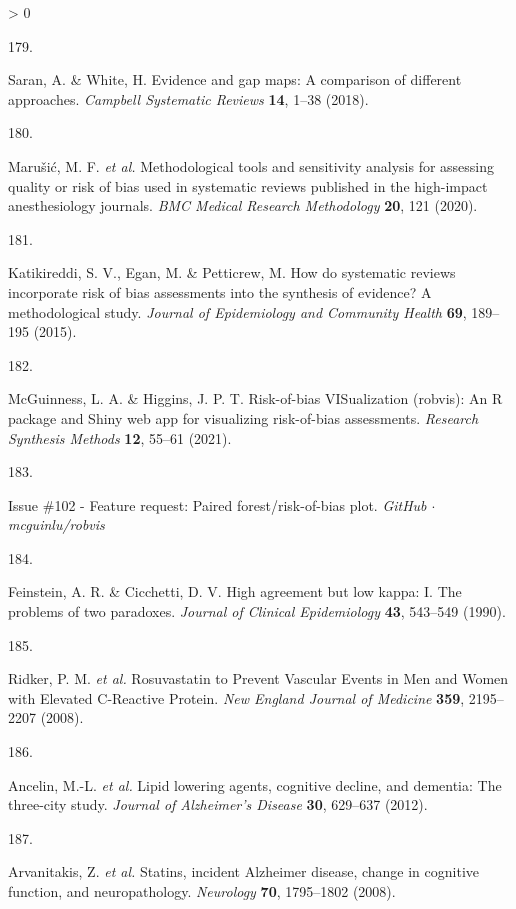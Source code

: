 \documentclass[a4paper, twoside]{templates/ociamthesis}
\newlength{\cslhangindent}
\newlength{\csllabelwidth}
\newenvironment{CSLReferences}[3] %
 {%
  \setlength{\parindent}{0pt}
  \ifodd #1 \everypar{\setlength{\hangindent}{\cslhangindent}}\ignorespaces\fi
  \ifnum #2 > 0
  \setlength{\parskip}{#2\baselineskip}
  \fi
 }%
 {}
\newcommand{\CSLLeftMargin}[1]{\parbox[t]{\maxof{\widthof{#1}}{\csllabelwidth}}{#1}}
\newcommand{\CSLRightInline}[1]{\parbox[t]{\linewidth - \csllabelwidth}{#1}}
\begin{document}
\begin{CSLReferences}{0}{0}
\leavevmode\hypertarget{ref-saran2018}{}%
\CSLLeftMargin{179. }
\CSLRightInline{Saran, A. \& White, H. Evidence and gap maps: A comparison of different approaches. \emph{Campbell Systematic Reviews} \textbf{14}, 1--38 (2018).}

\leavevmode\hypertarget{ref-marusic2020}{}%
\CSLLeftMargin{180. }
\CSLRightInline{Marušić, M. F. \emph{et al.} Methodological tools and sensitivity analysis for assessing quality or risk of bias used in systematic reviews published in the high-impact anesthesiology journals. \emph{BMC Medical Research Methodology} \textbf{20}, 121 (2020).}

\leavevmode\hypertarget{ref-katikireddi2015}{}%
\CSLLeftMargin{181. }
\CSLRightInline{Katikireddi, S. V., Egan, M. \& Petticrew, M. How do systematic reviews incorporate risk of bias assessments into the synthesis of evidence? A methodological study. \emph{Journal of Epidemiology and Community Health} \textbf{69}, 189--195 (2015).}

\leavevmode\hypertarget{ref-mcguinness2020robvisPaper}{}%
\CSLLeftMargin{182. }
\CSLRightInline{McGuinness, L. A. \& Higgins, J. P. T. Risk-of-bias {VISualization} (robvis): An {R} package and {Shiny} web app for visualizing risk-of-bias assessments. \emph{Research Synthesis Methods} \textbf{12}, 55--61 (2021).}

\leavevmode\hypertarget{ref-zotero-14999}{}%
\CSLLeftMargin{183. }
\CSLRightInline{Issue \#102 - {Feature} request: Paired forest/risk-of-bias plot. \emph{GitHub {\(\cdot\)} mcguinlu/robvis}}

\leavevmode\hypertarget{ref-feinstein1990}{}%
\CSLLeftMargin{184. }
\CSLRightInline{Feinstein, A. R. \& Cicchetti, D. V. High agreement but low kappa: I. {The} problems of two paradoxes. \emph{Journal of Clinical Epidemiology} \textbf{43}, 543--549 (1990).}

\leavevmode\hypertarget{ref-ridker2008}{}%
\CSLLeftMargin{185. }
\CSLRightInline{Ridker, P. M. \emph{et al.} Rosuvastatin to {Prevent Vascular Events} in {Men} and {Women} with {Elevated C}-{Reactive Protein}. \emph{New England Journal of Medicine} \textbf{359}, 2195--2207 (2008).}

\leavevmode\hypertarget{ref-ancelin2012}{}%
\CSLLeftMargin{186. }
\CSLRightInline{Ancelin, M.-L. \emph{et al.} Lipid lowering agents, cognitive decline, and dementia: The three-city study. \emph{Journal of Alzheimer's Disease} \textbf{30}, 629--637 (2012).}

\leavevmode\hypertarget{ref-arvanitakis2008}{}%
\CSLLeftMargin{187. }
\CSLRightInline{Arvanitakis, Z. \emph{et al.} Statins, incident {Alzheimer} disease, change in cognitive function, and neuropathology. \emph{Neurology} \textbf{70}, 1795--1802 (2008).}


\end{CSLReferences}
\end{document}
